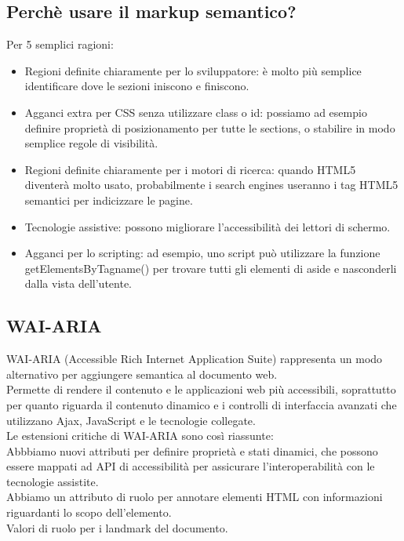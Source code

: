\documentclass{article}
\begin{document}
\subsection{Perchè usare il markup semantico?}
Per 5 semplici ragioni:
\begin{itemize}
	\item Regioni definite chiaramente per lo sviluppatore: è molto più semplice identificare dove le sezioni iniscono e finiscono.
	\item Agganci extra per CSS senza utilizzare class o id: possiamo ad esempio definire proprietà di posizionamento per tutte le sections, o stabilire in modo semplice regole di visibilità.
	\item Regioni definite chiaramente per i motori di ricerca: quando HTML5 diventerà molto usato, probabilmente i search engines useranno i tag HTML5 semantici per indicizzare le pagine.
	\item Tecnologie assistive: possono migliorare l'accessibilità dei lettori di schermo.
	\item Agganci per lo scripting: ad esempio, uno script può utilizzare la funzione getElementsByTagname() per trovare tutti gli elementi di aside e nasconderli dalla vista dell'utente.
\end{itemize}
\subsection{WAI-ARIA}
WAI-ARIA (Accessible Rich Internet Application Suite) rappresenta un modo alternativo per aggiungere semantica al documento web.\\ 
Permette di rendere il contenuto e le applicazioni web più accessibili, soprattutto per quanto riguarda il contenuto dinamico e i controlli di interfaccia avanzati che utilizzano Ajax, JavaScript e le tecnologie collegate.\\
Le estensioni critiche di WAI-ARIA sono così riassunte: \\
Abbbiamo nuovi attributi per definire proprietà e stati dinamici, che possono essere mappati ad API di accessibilità per assicurare l'interoperabilità con le tecnologie assistite.\\
Abbiamo un attributo di ruolo per annotare elementi HTML con informazioni riguardanti lo scopo dell'elemento.\\
Valori di ruolo per i landmark del documento. 
\end{document}
